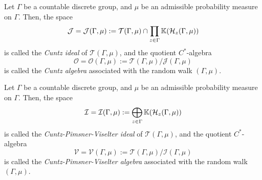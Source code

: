 \documentclass[12pt, class = article, crop = false, a4paper, twoside]{standalone}
\begin{document}
\begin{definition}

    Let $\Gamma$ be a countable discrete group, and $\mu$ be an admissible probability measure on $\Gamma$. Then, the space 
    \begin{equation}
        \mathcal{J} = \mathcal{J}(\Gamma, \mu) := \mathcal{T}(\Gamma, \mu)\cap\prod_{z\in \Gamma}\mathbb{K}(\mathcal{H}_{z}(\Gamma, \mu))
    \end{equation}
    is called the \textit{Cuntz ideal} of $\mathcal{T}(\Gamma, \mu)$, and the quotient $C^{\ast}$-algebra
    \begin{equation}
        \mathcal{O} = \mathcal{O}(\Gamma, \mu) := \mathcal{T}(\Gamma, \mu)/\mathcal{J}(\Gamma, \mu)
    \end{equation}
    is called the \textit{Cuntz algebra} associated with the random walk $(\Gamma, \mu)$.
\end{definition}

\begin{definition}

    Let $\Gamma$ be a countable discrete group, and $\mu$ be an admissible probability measure on $\Gamma$. Then, the space 
    \begin{equation}
        \mathcal{I} = \mathcal{I}(\Gamma, \mu) := \bigoplus_{z\in \Gamma}\mathbb{K}(\mathcal{H}_{z}(\Gamma, \mu))
    \end{equation}
    is called the \textit{Cuntz-Pimsner-Viselter ideal} of $\mathcal{T}(\Gamma, \mu)$, and the quotient $C^{\ast}$-algebra
    \begin{equation}
        \mathcal{V} = \mathcal{V}(\Gamma, \mu) := \mathcal{T}(\Gamma, \mu)/\mathcal{I}(\Gamma, \mu)
    \end{equation}
    is called the \textit{Cuntz-Pimsner-Viselter algebra} associated with the random walk $(\Gamma, \mu)$.
\end{definition}
\end{document}
